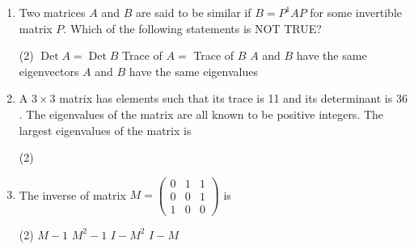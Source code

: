 \begin{enumerate}
\begin{tasks}
	\end{tasks}
	\item Two matrices $A$ and $B$ are said to be similar if $B=P^{1} A P$ for some invertible matrix $P$. Which of the following statements is NOT TRUE?
	 \begin{tasks}(2)
		\task[\textbf{a.}] $\operatorname{Det} A=\operatorname{Det} B$
		\task[\textbf{b.}] Trace of $A=$ Trace of $B$
		\task[\textbf{c.}]$A$ and $B$ have the same eigenvectors
		\task[\textbf{d.}]  $A$ and $B$ have the same eigenvalues
	\end{tasks}
	\item A $3 \times 3$ matrix has elements such that its trace is 11 and its determinant is 36 . The eigenvalues of the matrix are all known to be positive integers. The largest eigenvalues of the matrix is
	 \begin{tasks}(2)
	\end{tasks}
	\item The inverse of matrix $M=\left(\begin{array}{lll}0 & 1 & 1 \\ 0 & 0 & 1 \\ 1 & 0 & 0\end{array}\right)$ is
	 \begin{tasks}(2)
		\task[\textbf{a.}]$M-1$
		\task[\textbf{b.}]$M^{2}-1$
		\task[\textbf{c.}] $I-M^{2}$
		\task[\textbf{d.}] $I-M$
	\end{tasks}

\end{enumerate}
